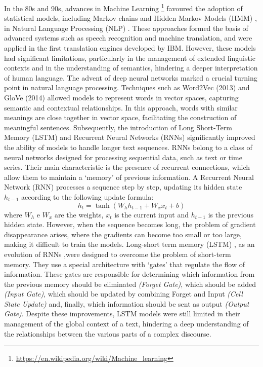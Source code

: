 In the 80s and 90s, advances in Machine Learning \footnote{\url{https://en.wikipedia.org/wiki/Machine_learning}} favoured the adoption of statistical models, including Markov chains and Hidden Markov Models (HMM) \cite{HMM},  in Natural Language Processing (NLP) \cite{NLP}.
These approaches formed the basis of advanced systems such as speech recognition and machine translation, and were applied in the first translation engines developed by IBM. However, these models had significant limitations, particularly in the management of extended linguistic contexts and in the understanding of semantics, hindering a deeper interpretation of human language.
The advent of deep neural networks marked a crucial turning point in natural language processing.
Techniques such as Word2Vec (2013) \cite{Word2vec} and GloVe (2014) \cite{Glove} allowed models to represent words in vector spaces, capturing semantic and contextual relationships. 
In this approach, words with similar meanings are close together in vector space, facilitating the construction of meaningful sentences.
Subsequently, the introduction of Long Short-Term Memory (LSTM) \cite{LSTM} and Recurrent Neural Networks (RNNs) \cite{Rnn} significantly improved the ability of models to handle longer text sequences.
RNNs \cite{Rnn} belong to a class of neural networks designed for processing sequential data, such as text or time series. Their main characteristic is the presence of recurrent connections, which allow them to maintain a ‘memory’ of previous information.
A Recurrent Neural Network (RNN) processes a sequence step by step, updating its hidden state \( h_{t-1} \)  according to the following update formula:\\
\begin{equation}
    h_t = \tanh(W_h h_{t-1} + W_x x_t + b)
\end{equation}
where \( W_h \) e \( W_x \) are the weights, \( x_t \) is the current input and \( h_{t-1} \) is the previous hidden state.
However, when the sequence becomes long, the problem of gradient disappearance \cite{Vanishing} arises, where the gradients can become too small or too large, making it difficult to train the models.
Long-short term memory (LSTM) \cite{LSTM}, as an evolution of RNNs \cite{Rnn},were designed to overcome the problem of short-term memory.
They use a special architecture with ‘gates’ that regulate the flow of information.
These gates are responsible for determining which information from the previous memory should be eliminated \textit{(Forget Gate)},  which should be added \textit{(Input Gate)}, which should be updated by combining Forget and Input \textit{(Cell State Update)} and, finally, which information should be sent as output \textit{(Output Gate)}.
Despite these improvements, LSTM models were still limited in their management of the global context of a text, hindering a deep understanding of the relationships between the various parts of a complex discourse.
